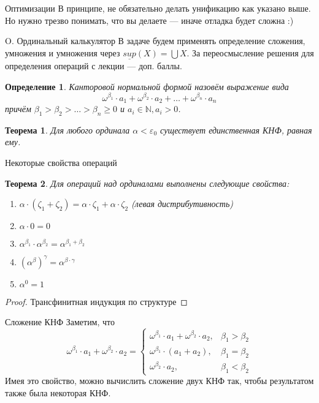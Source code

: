 \documentclass[aspectratio=169]{beamer}
\newtheorem{thm}{Теорема}[section]
\newtheorem{dfn}{Определение}[section]
\begin{document}
\begin{frame}{Оптимизации}
В принципе, не обязательно делать унификацию как указано выше. Но нужно трезво понимать, что вы делаете --- иначе 
отладка будет сложна :)
\end{frame}

\begin{frame}{O. Ординальный калькулятор}
В задаче будем применять определение сложения, умножения и умножения через $\underline{sup}(X) = \bigcup X$.
За переосмысление решения для определения операций с лекции --- доп. баллы.
\begin{dfn}Канторовой нормальной формой назовём выражение вида
$$\omega^{\beta_1}\cdot a_1 + \omega^{\beta_2}\cdot a_2 + \dots + \omega^{\beta_n} \cdot a_n$$
причём $\beta_1 > \beta_2 > \dots > \beta_n \ge 0$ и $a_i \in \mathbb{N}, a_i > 0$.
\end{dfn}

\begin{thm}Для любого ординала $\alpha < \varepsilon_0$ существует единственная КНФ, равная ему.\end{thm}
\end{frame}

\begin{frame}{Некоторые свойства операций}
\begin{thm}Для операций над ординалами выполнены следующие свойства:
\begin{enumerate}
\item $\alpha\cdot(\zeta_1+\zeta_2) = \alpha\cdot\zeta_1 + \alpha\cdot\zeta_2$ (левая дистрибутивность)
\item $\alpha\cdot 0 = 0$
\item $\alpha^{\beta_1}\cdot\alpha^{\beta_2} = \alpha^{\beta_1+\beta_2}$
\item $(\alpha^\beta)^\gamma = \alpha^{\beta\cdot\gamma}$
\item $\alpha^0 = 1$
\end{enumerate}
\end{thm}
\begin{proof}Трансфинитная индукция по структуре\end{proof}
\end{frame}

\begin{frame}{Сложение КНФ}
Заметим, что $$\omega^{\beta_1}\cdot a_1 + \omega^{\beta_2}\cdot a_2 = \left\{\begin{array}{ll}
\omega^{\beta_1}\cdot a_1 + \omega^{\beta_2}\cdot a_2, & \beta_1 > \beta_2\\
\omega^{\beta_1}\cdot (a_1 + a_2), & \beta_1 = \beta_2\\
\omega^{\beta_2}\cdot a_2, & \beta_1 < \beta_2\end{array}\right.$$
Имея это свойство, можно вычислить сложение двух КНФ так, чтобы результатом также была некоторая КНФ.
\end{frame}
\end{document}

